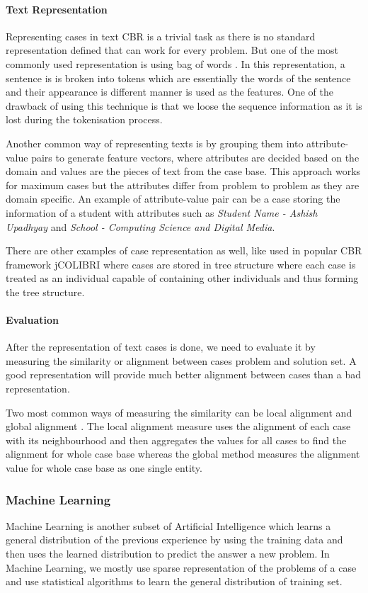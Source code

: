 \paragraph{Text Representation}
Representing cases in text CBR is a trivial task as there is no standard representation defined that can work for every problem. But one of the most commonly used representation is using bag of words \cite{10.5555/646268.684025}. In this representation, a sentence is is broken into tokens which are essentially the words of the sentence and their appearance is different manner is used as the features. One of the drawback of using this technique is that we loose the sequence information as it is lost during the tokenisation process.

Another common way of representing texts is by grouping them into attribute-value pairs to generate feature vectors, where attributes are decided based on the domain and values are the pieces of text from the case base. This approach works for maximum cases but the attributes differ from problem to problem as they are domain specific. An example of attribute-value pair can be a case storing the information of a student with attributes such as \textit{Student Name - Ashish Upadhyay} and \textit{School - Computing Science and Digital Media}.

There are other examples of case representation as well, like used in popular CBR framework jCOLIBRI where cases are stored in tree structure where each case is treated as an individual capable of containing other individuals and thus forming the tree structure.

\paragraph{Evaluation}
After the representation of text cases is done, we need to evaluate it by measuring the similarity or alignment between cases problem and solution set. A good representation will provide much better alignment between cases than a bad representation.

Two most common ways of measuring the similarity can be local alignment and global alignment \cite{raghunandan2008evaluation}. The local alignment measure uses the alignment of each case with its neighbourhood and then aggregates the values for all cases to find the alignment for whole case base whereas the global method measures the alignment value for whole case base as one single entity.

\subsubsection{Machine Learning}
Machine Learning is another subset of Artificial Intelligence which learns a general distribution of the previous experience by using the training data and then uses the learned distribution to predict the answer a new problem. In Machine Learning, we mostly use sparse representation of the problems of a case and use statistical algorithms to learn the general distribution of training set.


